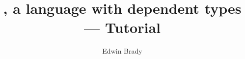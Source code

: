 \documentclass{article}
\begin{document}
\title{\Idris{}, a language with dependent types --- Tutorial}
\author{Edwin Brady}

 
\maketitle















%

\end{document}
